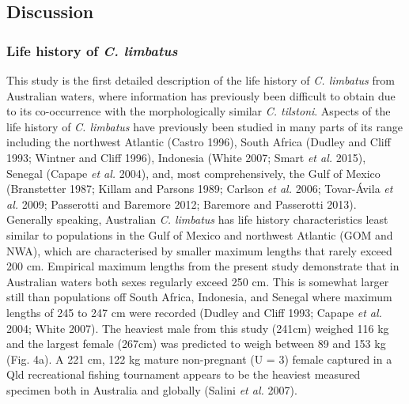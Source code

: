\documentclass[]{article}
\begin{document}
\hypertarget{discussion}{%
\subsection{Discussion}\label{discussion}}

\hypertarget{life-history-of-c.-limbatus}{%
\subsubsection{\texorpdfstring{Life history of \emph{C.
limbatus}}{Life history of C. limbatus}}\label{life-history-of-c.-limbatus}}

This study is the first detailed description of the life history of
\emph{C. limbatus} from Australian waters, where information has
previously been difficult to obtain due to its co-occurrence with the
morphologically similar \emph{C. tilstoni}. Aspects of the life history
of \emph{C. limbatus} have previously been studied in many parts of its
range including the northwest Atlantic (Castro 1996), South Africa
(Dudley and Cliff 1993; Wintner and Cliff 1996), Indonesia (White 2007;
Smart \emph{et al.} 2015), Senegal (Capape \emph{et al.} 2004), and,
most comprehensively, the Gulf of Mexico (Branstetter 1987; Killam and
Parsons 1989; Carlson \emph{et al.} 2006; Tovar-Ávila \emph{et al.}
2009; Passerotti and Baremore 2012; Baremore and Passerotti 2013).
Generally speaking, Australian \emph{C. limbatus} has life history
characteristics least similar to populations in the Gulf of Mexico and
northwest Atlantic (GOM and NWA), which are characterised by smaller
maximum lengths that rarely exceed 200 cm. Empirical maximum lengths
from the present study demonstrate that in Australian waters both sexes
regularly exceed 250 cm. This is somewhat larger still than populations
off South Africa, Indonesia, and Senegal where maximum lengths of 245 to
247 cm were recorded (Dudley and Cliff 1993; Capape \emph{et al.} 2004;
White 2007). The heaviest male from this study (241cm) weighed 116 kg
and the largest female (267cm) was predicted to weigh between 89 and 153
kg (Fig. 4a). A 221 cm, 122 kg mature non-pregnant (U = 3) female
captured in a Qld recreational fishing tournament appears to be the
heaviest measured specimen both in Australia and globally (Salini
\emph{et al.} 2007).
\end{document}
